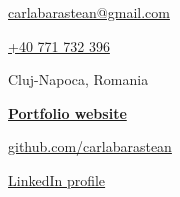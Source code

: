 \documentclass[10pt]{spidercv}
\begin{document}
\begin{TopBar}{\ColorTextSide}

  \begin{DoubleColumns}
    \begin{ItemList}{\ColorHighlight}
      \item[\Large\faAt] \href{mailto:carlabarastean@gmail.com}{carlabarastean@gmail.com}
      \item[\Large\faMobile] \href{tel:+40771732396}{+40 771 732 396}
      \item[\Large\faMapMarker] Cluj-Napoca, Romania
    \end{ItemList}
    \nextcolumn
    \begin{ItemList}{\ColorHighlight}
      \item[\Large\faGlobe] \href{https://portofolio-carla-barastean.netlify.app}{\textbf{Portfolio website}}
      \item[\Large\faGithub] \href{https://github.com/carlabarastean}{github.com/carlabarastean}
      \item[\Large\faLinkedinSquare] \href{https://www.linkedin.com/in/carla-barastean-621326269/}{LinkedIn profile}
    \end{ItemList}
  \end{DoubleColumns}
\end{TopBar}
\end{document}
